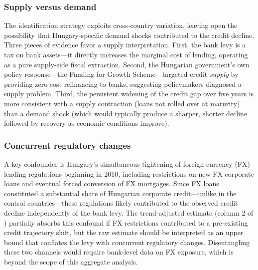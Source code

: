 \documentclass[12pt]{article}
\begin{document}
\subsubsection*{Supply versus demand} The identification strategy exploits cross-country variation, leaving open the possibility that Hungary-specific demand shocks contributed to the credit decline. Three pieces of evidence favor a supply interpretation. First, the bank levy is a tax on bank assets---it directly increases the marginal cost of lending, operating as a pure supply-side fiscal extraction. Second, the Hungarian government's own policy response---the Funding for Growth Scheme---targeted credit \textit{supply} by providing zero-cost refinancing to banks, suggesting policymakers diagnosed a supply problem. Third, the persistent widening of the credit gap over five years is more consistent with a supply contraction (loans not rolled over at maturity) than a demand shock (which would typically produce a sharper, shorter decline followed by recovery as economic conditions improve).

\subsubsection*{Concurrent regulatory changes} A key confounder is Hungary's simultaneous tightening of foreign currency (FX) lending regulations beginning in 2010, including restrictions on new FX corporate loans and eventual forced conversion of FX mortgages. Since FX loans constituted a substantial share of Hungarian corporate credit---unlike in the control countries---these regulations likely contributed to the observed credit decline independently of the bank levy. The trend-adjusted estimate (column 2 of ) partially absorbs this confound if FX restrictions contributed to a pre-existing credit trajectory shift, but the raw estimate should be interpreted as an upper bound that conflates the levy with concurrent regulatory changes. Disentangling these two channels would require bank-level data on FX exposure, which is beyond the scope of this aggregate analysis.
\end{document}
